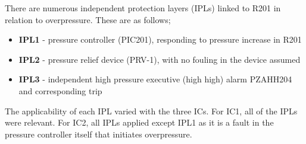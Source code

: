 
 
 There are numerous  independent protection layers (IPLs) linked to R201 in relation to overpressure. These are as follows;
 
 \begin{itemize}
\item  \textbf{IPL1} - pressure controller (PIC201), responding to pressure increase in R201
\item  \textbf{IPL2} - pressure relief device (PRV-1), with no fouling in the device assumed 
\item  \textbf{IPL3} - independent high pressure executive (high high) alarm PZAHH204 and corresponding trip
 \end{itemize}



The applicability of each IPL varied with the three ICs. For IC1, all of the IPLs were relevant. For IC2, all IPLs applied except IPL1 as it is a fault in the pressure controller itself that initiates overpressure. 







 